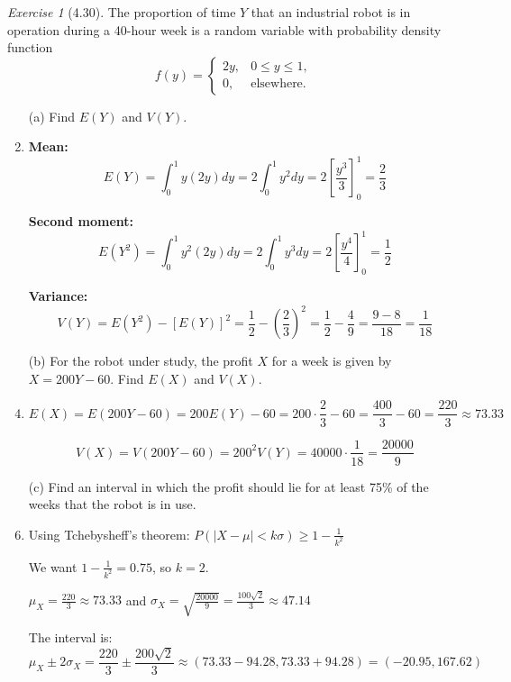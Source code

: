 \documentclass[12pt]{amsart}
\makeatletter
\theoremstyle{remark}
\newtheorem*{exercise}{Exercise}%
\renewenvironment{proof}[1][\proofname]{\par\doublespacing
  \pushQED{\qed}%
  \normalfont \topsep6\p@\@plus6\p@\relax
  \list{}{%
    \settowidth{\leftmargin}{\itshape\proofname:\hskip\labelsep}%
    \setlength{\labelwidth}{0pt}%
    \setlength{\itemindent}{-\leftmargin}%
  }%
  \item[\hskip\labelsep\itshape#1\@addpunct{:}]\ignorespaces
}{%
  \popQED\endlist\@endpefalse
  \singlespacing
}
\theoremstyle{mycomment}
\makeatother
\begin{document}
\begin{exercise}[4.30]
The proportion of time $Y$ that an industrial robot is in operation during a 40-hour week is a random variable with probability density function
$$f(y) = \begin{cases}
2y, & 0 \leq y \leq 1, \\
0, & \text{elsewhere}.
\end{cases}$$

\begin{enumerate}
    \item[(a)] Find $E(Y)$ and $V(Y)$.
\begin{proof}[Solution]
\textbf{Mean:}
$$E(Y) = \int_0^1 y(2y) dy = 2\int_0^1 y^2 dy = 2\left[\frac{y^3}{3}\right]_0^1 = \frac{2}{3}$$

\textbf{Second moment:}
$$E(Y^2) = \int_0^1 y^2(2y) dy = 2\int_0^1 y^3 dy = 2\left[\frac{y^4}{4}\right]_0^1 = \frac{1}{2}$$

\textbf{Variance:}
$$V(Y) = E(Y^2) - [E(Y)]^2 = \frac{1}{2} - \left(\frac{2}{3}\right)^2 = \frac{1}{2} - \frac{4}{9} = \frac{9 - 8}{18} = \frac{1}{18}$$
\end{proof}

    \item[(b)] For the robot under study, the profit $X$ for a week is given by $X = 200Y - 60$. Find $E(X)$ and $V(X)$.
\begin{proof}[Solution]
$$E(X) = E(200Y - 60) = 200E(Y) - 60 = 200 \cdot \frac{2}{3} - 60 = \frac{400}{3} - 60 = \frac{220}{3} \approx 73.33$$

$$V(X) = V(200Y - 60) = 200^2 V(Y) = 40000 \cdot \frac{1}{18} = \frac{20000}{9}$$
\end{proof}

    \item[(c)] Find an interval in which the profit should lie for at least 75\% of the weeks that the robot is in use.
\begin{proof}[Solution]
Using Tchebysheff's theorem: $P(|X - \mu| < k\sigma) \geq 1 - \frac{1}{k^2}$

We want $1 - \frac{1}{k^2} = 0.75$, so $k = 2$.

$\mu_X = \frac{220}{3} \approx 73.33$ and $\sigma_X = \sqrt{\frac{20000}{9}} = \frac{100\sqrt{2}}{3} \approx 47.14$

The interval is:
$$\mu_X \pm 2\sigma_X = \frac{220}{3} \pm \frac{200\sqrt{2}}{3} \approx (73.33 - 94.28, 73.33 + 94.28) = (-20.95, 167.62)$$
\end{proof}
\end{enumerate}
\end{exercise}
\end{document}
